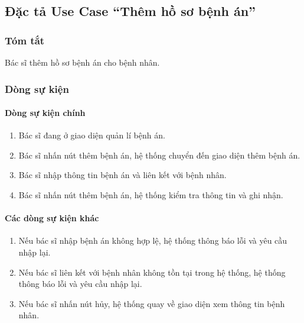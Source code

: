 \subsection{Đặc tả Use Case ``Thêm hồ sơ bệnh án''}

\subsubsection{Tóm tắt}
Bác sĩ thêm hồ sơ bệnh án cho bệnh nhân.

\subsubsection{Dòng sự kiện}
\paragraph{\textbf{Dòng sự kiện chính}}
\begin{enumerate}
  \item Bác sĩ đang ở giao diện quản lí bệnh án.
  \item Bác sĩ nhấn nút thêm bệnh án, hệ thống chuyển đến giao diện thêm bệnh án.
  \item Bác sĩ nhập thông tin bệnh án và liên kết với bệnh nhân.
  \item Bác sĩ nhấn nút thêm bệnh án, hệ thống kiểm tra thông tin và ghi nhận.
\end{enumerate}

\paragraph{\textbf{Các dòng sự kiện khác}}
\begin{enumerate}
  \item Nếu bác sĩ nhập bệnh án không hợp lệ, hệ thống thông báo lỗi và yêu cầu nhập lại.
  \item Nếu bác sĩ liên kết với bệnh nhân không tồn tại trong hệ thống, hệ thống thông báo lỗi và yêu cầu nhập lại.
  \item Nếu bác sĩ nhấn nút hủy, hệ thống quay về giao diện xem thông tin bệnh nhân.
\end{enumerate}

